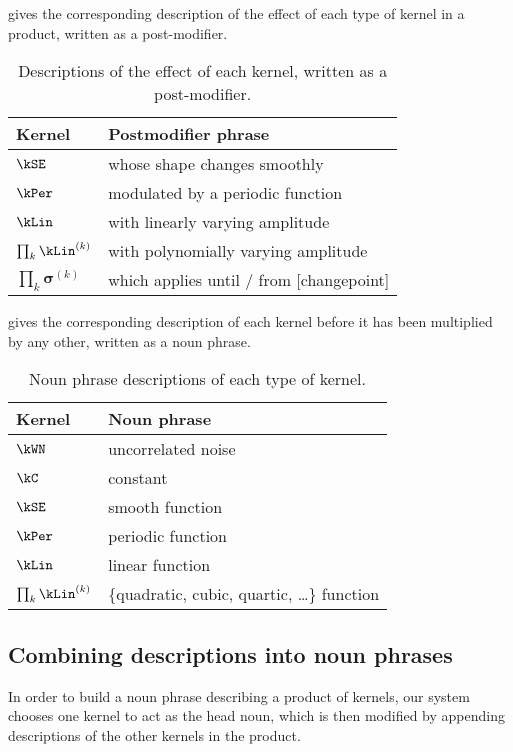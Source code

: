  gives the corresponding description of the effect of each type of kernel in a product, written as a post-modifier.
%
\begin{table}[h!]
\centering
\begin{tabular}{l|l}
Kernel & Postmodifier phrase \\
\midrule
$\kSE$  & whose shape changes smoothly \\
$\kPer$ & modulated by a periodic function \\
$\kLin$ & with linearly varying amplitude \\
$\prod_k \kLin^{(k)}$ & with polynomially varying amplitude \\
$\prod_k \boldsymbol{\sigma}^{(k)}$ & which applies until / from [changepoint] \\
\end{tabular}
\caption[Descriptions of the effect of each kernel, written as a post-modifier]{
Descriptions of the effect of each kernel, written as a post-modifier.
}
\label{table:modifiers}
\end{table}

 gives the corresponding description of each kernel before it has been multiplied by any other, written as a noun phrase.
%
\begin{table}[h!]
\centering
\begin{tabular}{l|l}
Kernel & Noun phrase \\
\midrule
$\kWN$  & uncorrelated noise \\
$\kC$   & constant \\
$\kSE$  & smooth function \\
$\kPer$ & periodic function \\
$\kLin$ & linear function \\
$\prod_k \kLin^{(k)}$ & \{quadratic, cubic, quartic, \dots \} function %
\end{tabular}
\caption[Noun phrase descriptions of each type of kernel]{
Noun phrase descriptions of each type of kernel.}
\label{table:nouns}
\end{table}



\subsection{Combining descriptions into noun phrases}

In order to build a noun phrase describing a product of kernels, our system chooses one kernel to act as the head noun, which is then modified by appending descriptions of the other kernels in the product.

